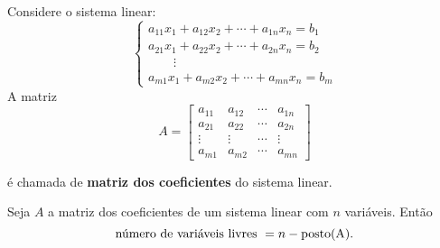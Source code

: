 \documentclass{beamer}
\begin{document}
    \begin{frame}
        Considere o sistema linear:
        \begin{equation*}
	        \begin{cases}
                a_{11}x_1 + a_{12}x_2 + \cdots + a_{1n}x_n = b_1\\
                a_{21}x_1 + a_{22}x_2 + \cdots + a_{2n}x_n = b_2\\
                \qquad \vdots\\
                a_{m1}x_1 + a_{m2}x_2 + \cdots + a_{mn}x_n = b_m
            \end{cases}
        \end{equation*}
        A matriz
        \[
            A = \begin{bmatrix}
                a_{11} & a_{12} & \cdots & a_{1n}\\
                a_{21} & a_{22} & \cdots & a_{2n}\\
                \vdots & \vdots & \cdots & \vdots\\
                a_{m1} & a_{m2} & \cdots & a_{mn}
            \end{bmatrix}
        \]

        é chamada de \textbf{matriz dos coeficientes} do sistema linear.
    \end{frame}

    \begin{frame}

        \begin{teorema}
            Seja $A$ a matriz dos coeficientes de um sistema linear com $n$ variáveis. Então
            \[
                \mbox{número de variáveis livres } = n - \mbox{\textrm{posto(A)}}.
            \]
        \end{teorema}
    \end{frame}
\end{document}
